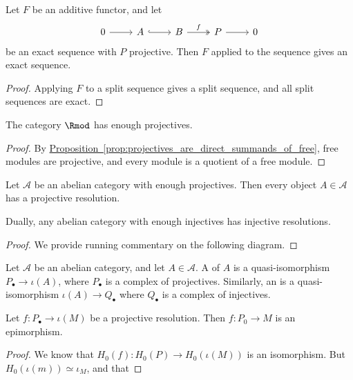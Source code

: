 \documentclass[main.tex]{subfiles}
\begin{document}
\begin{corollary}
  Let $F$ be an additive functor, and let
  \begin{equation*}
    \begin{tikzcd}
      0
      \arrow[r]
      & A
      \arrow[r, hookrightarrow]
      & B
      \arrow[r, twoheadrightarrow, "f"]
      & P
      \arrow[r]
      & 0
    \end{tikzcd}
  \end{equation*}
  be an exact sequence with $P$ projective. Then $F$ applied to the sequence gives an exact sequence.
\end{corollary}
\begin{proof}
  Applying $F$ to a split sequence gives a split sequence, and all split sequences are exact.
\end{proof}

\begin{corollary}
  The category $\Rmod$ has enough projectives.
\end{corollary}
\begin{proof}
  By \hyperref[prop:projectives_are_direct_summands_of_free]{Proposition~\ref*{prop:projectives_are_direct_summands_of_free}}, free modules are projective, and every module is a quotient of a free module.
\end{proof}

\begin{proposition}
  Let $\mathcal{A}$ be an abelian category with enough projectives. Then every object $A \in \mathcal{A}$ has a projective resolution.

  Dually, any abelian category with enough injectives has injective resolutions.
\end{proposition}
\begin{proof}
  We provide running commentary on the following diagram.
\end{proof}

\begin{definition}
  \label{def:projective_injective_resolution}
  Let $\mathcal{A}$ be an abelian category, and let $A \in \mathcal{A}$. A  of $A$ is a quasi-isomorphism $P_{\bullet} \to \iota(A)$, where $P_{\bullet}$ is a complex of projectives. Similarly, an  is a quasi-isomorphism $\iota(A) \to Q_{\bullet}$ where $Q_{\bullet}$ is a complex of injectives.
\end{definition}

\begin{lemma}
  \label{lemma:projective_resolution_epimorphism}
  Let $f\colon P_{\bullet} \to \iota(M)$ be a projective resolution. Then $f\colon P_{0} \to M$ is an epimorphism.
\end{lemma}
\begin{proof}
  We know that $H_{0}(f)\colon H_{0}(P) \to H_{0}(\iota (M))$ is an isomorphism. But $H_{0}(\iota(m)) \simeq \iota_{M}$, and that
\end{proof}
\end{document}

